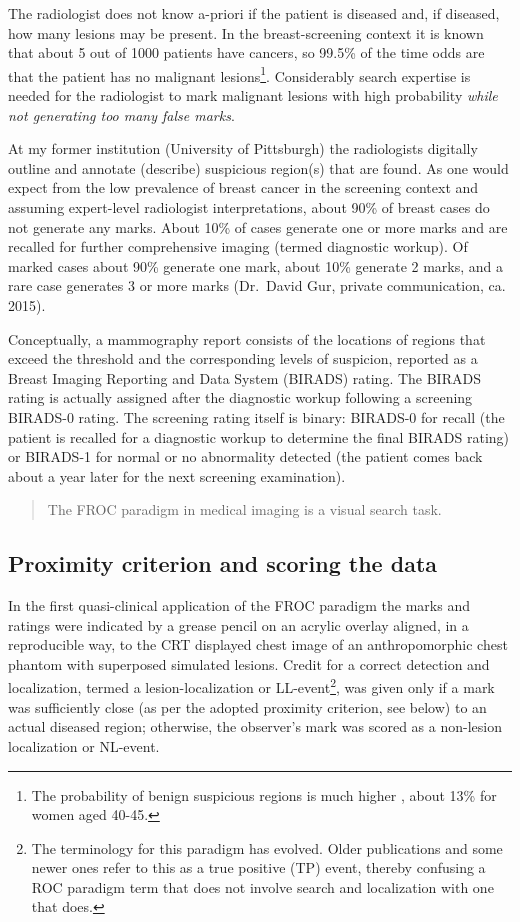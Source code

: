 \documentclass[
]{book}
\begin{document}
The radiologist does not know a-priori if the patient is diseased and, if diseased, how many lesions may be present. In the breast-screening context it is known that about 5 out of 1000 patients have cancers, so 99.5\% of the time odds are that the patient has no malignant lesions\footnote{The probability of benign suspicious regions is much higher \citep{Ernster1981Epidemiology}, about 13\% for women aged 40-45.}. Considerably search expertise is needed for the radiologist to mark malignant lesions with high probability \emph{while not generating too many false marks}.

At my former institution (University of Pittsburgh) the radiologists digitally outline and annotate (describe) suspicious region(s) that are found. As one would expect from the low prevalence of breast cancer in the screening context and assuming expert-level radiologist interpretations, about 90\% of breast cases do not generate any marks. About 10\% of cases generate one or more marks and are recalled for further comprehensive imaging (termed diagnostic workup). Of marked cases about 90\% generate one mark, about 10\% generate 2 marks, and a rare case generates 3 or more marks (Dr.~David Gur, private communication, ca. 2015).

Conceptually, a mammography report consists of the locations of regions that exceed the threshold and the corresponding levels of suspicion, reported as a Breast Imaging Reporting and Data System (BIRADS) rating. The BIRADS rating is actually assigned after the diagnostic workup following a screening BIRADS-0 rating. The screening rating itself is binary: BIRADS-0 for recall (the patient is recalled for a diagnostic workup to determine the final BIRADS rating) or BIRADS-1 for normal or no abnormality detected (the patient comes back about a year later for the next screening examination).

\begin{quote}
The FROC paradigm in medical imaging is a visual search task.
\end{quote}

\hypertarget{froc-paradigm-scoring-the-data}{%
\subsection{Proximity criterion and scoring the data}\label{froc-paradigm-scoring-the-data}}

In the first quasi-clinical application of the FROC paradigm \citep{Chakraborty1986DigitalVsConv} the marks and ratings were indicated by a grease pencil on an acrylic overlay aligned, in a reproducible way, to the CRT displayed chest image of an anthropomorphic chest phantom with superposed simulated lesions. Credit for a correct detection and localization, termed a lesion-localization or LL-event\footnote{The terminology for this paradigm has evolved. Older publications and some newer ones refer to this as a true positive (TP) event, thereby confusing a ROC paradigm term that does not involve search and localization with one that does.}, was given only if a mark was sufficiently close (as per the adopted proximity criterion, see below) to an actual diseased region; otherwise, the observer's mark was scored as a non-lesion localization or NL-event.
\end{document}
